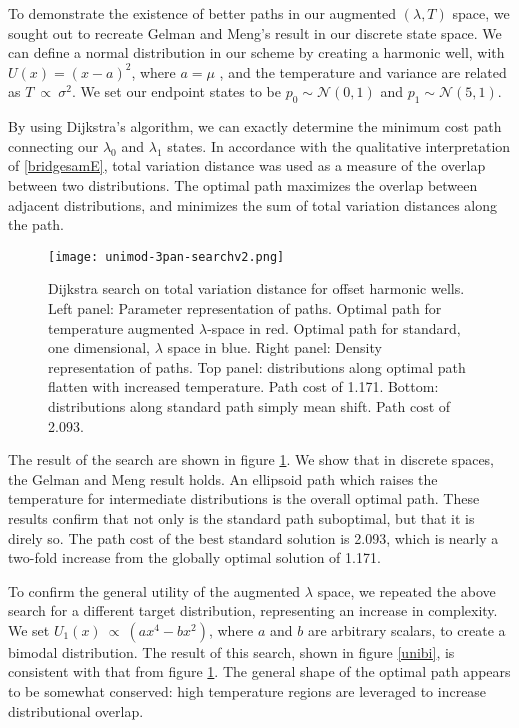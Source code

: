 To demonstrate the existence of better paths in our augmented $(\lambda, T)$ space, we sought out to recreate Gelman and Meng's result in our discrete state space. 
We can define a normal distribution in our scheme by creating a harmonic well, with $U(x)=(x-a)^2$, where $a=\mu$ , and the temperature and variance are related as $T ~\propto~ \sigma^2$. We set our endpoint states to be $p_0\sim\mathcal{N}(0,1)$ and $p_1\sim\mathcal{N}(5,1)$.

By using Dijkstra's algorithm\cite{dijkstra1959note}, we can exactly determine the minimum cost path connecting our $\lambda_0$ and $\lambda_1$ states. In accordance with the qualitative interpretation of \eqref{bridgesamE}, total variation distance was used as a measure of the overlap between two distributions. The optimal path maximizes the overlap between adjacent distributions, and minimizes the sum of total variation distances along the path. 

\begin{figure}
\centering
\texttt{[image: unimod-3pan-searchv2.png]}
\caption[Dijkstra search on total variation distance for offset harmonic wells]{Dijkstra search on total variation distance for offset harmonic wells. Left panel: Parameter representation of paths. Optimal path for temperature augmented $\lambda$-space in red. Optimal path for standard, one dimensional, $\lambda$ space in blue. Right panel: Density representation of paths. Top panel: distributions along optimal path flatten with increased temperature. Path cost of 1.171. Bottom: distributions along standard path simply mean shift. Path cost of 2.093.}
\label{uniuni}
\end{figure}

The result of the search are shown in figure \ref{uniuni}. We show that in discrete spaces, the Gelman and Meng result holds. An ellipsoid path which raises the temperature for intermediate distributions is the overall optimal path. These results confirm that not only is the standard path suboptimal, but that it is direly so. The path cost of the best standard solution is 2.093, which is nearly a two-fold increase from the globally optimal solution of 1.171.

To confirm the general utility of the augmented $\lambda$ space, we repeated the above search for a different target distribution, representing an increase in complexity. We set $U_1(x) ~\propto~ (ax^4-bx^2)$, where $a$ and $b$ are arbitrary scalars, to create a bimodal distribution. 
The result of this search, shown in figure \ref{unibi}, is consistent with that from figure \ref{uniuni}. The general shape of the optimal path appears to be somewhat conserved: high temperature regions are leveraged to increase distributional overlap.

